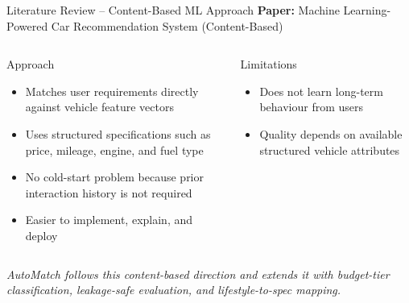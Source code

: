 \documentclass[aspectratio=169]{beamer}
\begin{document}
\begin{frame}{Literature Review -- Content-Based ML Approach}
  \textbf{Paper:} Machine Learning-Powered Car Recommendation System (Content-Based)
  \vspace{0.5em}
  \begin{columns}[t]
      \begin{block}{Approach}
        \begin{itemize}
          \item Matches user requirements directly against vehicle feature vectors
          \item Uses structured specifications such as price, mileage, engine, and fuel type
          \item No cold-start problem because prior interaction history is not required
          \item Easier to implement, explain, and deploy
        \end{itemize}
      \end{block}
      \begin{alertblock}{Limitations}
        \begin{itemize}
          \item Does not learn long-term behaviour from users
          \item Quality depends on available structured vehicle attributes
        \end{itemize}
      \end{alertblock}
  \end{columns}
  \vspace{0.5em}
  \small\textit{AutoMatch follows this content-based direction and extends it with budget-tier classification, leakage-safe evaluation, and lifestyle-to-spec mapping.}
\end{frame}

\end{document}
